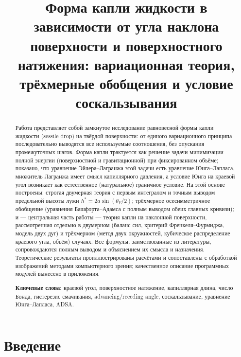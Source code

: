 \documentclass[11pt]{article}
\title{\textbf{Форма капли жидкости в зависимости от угла наклона поверхности
и поверхностного натяжения: вариационная теория, трёхмерные обобщения
и условие соскальзывания}}
\author{}
\date{}
\newcommand{\thY}{\theta_{Y}}
\theoremstyle{definition}
\begin{document}
\maketitle
\vspace{-2.2em}

\begin{abstract}
\noindent
Работа представляет собой замкнутое исследование равновесной формы капли
жидкости (sessile drop) на твёрдой поверхности: от единого вариационного
принципа последовательно выводятся все используемые соотношения, без опускания
промежуточных шагов. Форма капли трактуется как решение задачи минимизации полной
энергии (поверхностной и гравитационной) при фиксированном объёме; показано, что
уравнение Эйлера--Лагранжа этой задачи есть уравнение Юнга--Лапласа, множитель
Лагранжа имеет смысл капиллярного давления, а условие Юнга на краевой угол
возникает как естественное (натуральное) граничное условие. На этой основе
построены: строгая двумерная теория с первым интегралом и точным выводом
предельной высоты лужи $h^{*}=2a\sin(\thY/2)$; трёхмерное осесимметричное
обобщение (уравнения Башфорта--Адамса с полным выводом обеих главных кривизн);
и --- центральная часть работы --- теория капли на наклонной поверхности,
рассмотренная отдельно в двумерном (баланс сил, критерий Френкеля--Фурмиджа,
модель двух дуг) и трёхмерном (метод двух окружностей, кубическое распределение
краевого угла, объём) случаях. Все формулы, заимствованные из литературы,
сопровождаются полным выводом и объяснением их смысла и назначения. Теоретические
результаты проиллюстрированы расчётами и сопоставлены с обработкой изображений
методами компьютерного зрения; качественное описание программных модулей вынесено
в приложения.

\smallskip
\noindent\textbf{Ключевые слова:} краевой угол, поверхностное натяжение,
капиллярная длина, число Бонда, гистерезис смачивания, advancing/receding angle,
соскальзывание, уравнение Юнга--Лапласа, ADSA.
\end{abstract}

\tableofcontents
\bigskip

\section{Введение}
\end{document}
